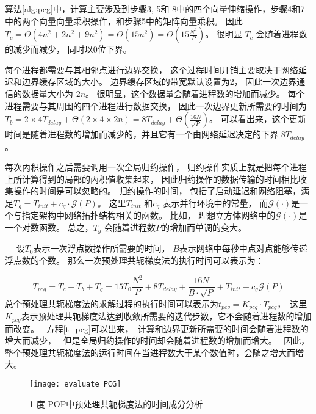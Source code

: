  算法\ref{alg:pcg}中，计算主要涉及到步骤3, 5和 8中的四个向量伸缩操作，步骤4和7中的两个向量向量乘积操作，和步骤5中的矩阵向量乘积。 
 因此 $T_c= \Theta (4 n^2 +2n^2+ 9n^2) = \Theta (15n^2) =\Theta(15\frac{N^2}{P})$。 
很明显 $T_c$ 会随着进程数的减少而减少， 同时以0位下界。 


每个进程都需要与其相邻点进行边界交换， 这个过程时间开销主要取决于网络延迟和边界缓存区域的大小。 
边界缓存区域的带宽默认设置为2， 因此一次边界通信的数据量大小为 $2n$。 
很明显，这个数据量会随着进程数的增加而减少。 
每个进程需要与其周围的四个进程进行数据交换， 因此一次边界更新所需要的时间为$T_b =2\times4T_{delay} +\Theta (2\times4\times 2n)=8T_{delay} +\Theta (\frac{16N}{\sqrt{P}})$。 
可以看出来，这个更新时间是随着进程数的增加而减少的，并且它有一个由网络延迟决定的下界 $8T_{delay}$。 

 
每次內积操作之后需要调用一次全局归约操作， 归约操作实质上就是把每个进程上所计算得到的局部的內积值收集起来，
因此归约操作的数据传输的时间相比收集操作的时间是可以忽略的。 
归约操作的时间， 包括了启动延迟和网络阻塞，满足$T_g= T_{init}+ c_g\cdot \mathcal{G}(P)$。 
这里$T_{init}$ 和$c_g$ 表示并行环境中的常量， 而$\mathcal{G}(\cdot)$是一个与指定架构中网络拓扑结构相关的函数。 
比如， 理想立方体网络中的$\mathcal{G}(\cdot)$是一个对数函数。 
总之，$T_g$ 会随着进程数$P$的增加而单调的变大。 
 

　
设$T_0$表示一次浮点数操作所需要的时间， $B$表示网络中每秒中点对点能够传递浮点数的个数。 
那么一次预处理共轭梯度法的执行时间可以表示为：

\begin{equation}
\label{t_pcg}
T_{pcg} = T_c + T_b + T_g
= 15 T_0\frac{N^2}{P} + 8T_{delay} + \frac{16N}{B\cdot\sqrt{P}}+T_{init} +c_g\mathcal{G}(P)
\end{equation}
总个预处理共轭梯度法的求解过程的执行时间可以表示为$t_{pcg} = K_{pcg}\cdot T_{pcg}$，　这里$K_{pcg}$表示预处理共轭梯度法达到收敛所需要的迭代步数，它不会随着进程数的增加而改变。　
方程\ref{t_pcg}可以出来，　计算和边界更新所需要的时间会随着进程数的增大而减少，　
但是全局归约操作的时间却会随着进程数的增加而增大。　
因此，整个预处理共轭梯度法的运行时间在当进程数大于某个数值时，会随之增大而增大。　

\begin {figure}%
 
\centering
\texttt{[image: evaluate\_PCG]}
\vspace{-10pt}
\caption[] {1 度 POP中预处理共轭梯度法的时间成分分析}
\label{fig:pcg_ratio}
 \end{figure}


